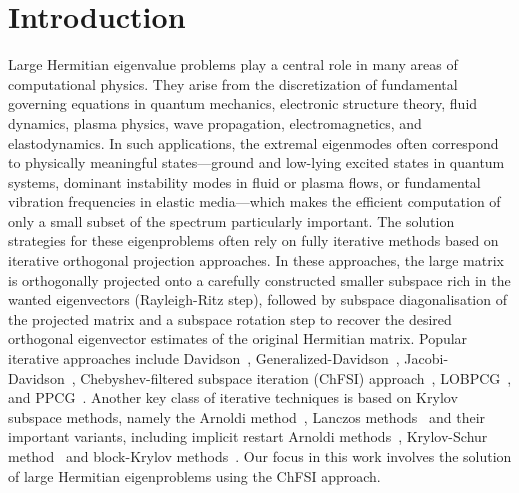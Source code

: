\documentclass[preprint,3p,number,sort&compress]{elsarticle}
\begin{document}
\section{Introduction}
Large Hermitian eigenvalue problems play a central role in many areas of computational physics. They arise from the discretization of fundamental governing equations in quantum mechanics, electronic structure theory, fluid dynamics, plasma physics, wave propagation, electromagnetics, and elastodynamics. In such applications, the extremal eigenmodes often correspond to physically meaningful states—ground and low-lying excited states in quantum systems, dominant instability modes in fluid or plasma flows, or fundamental vibration frequencies in elastic media—which makes the efficient computation of only a small subset of the spectrum particularly important. The solution strategies for these eigenproblems often rely on fully iterative methods based on iterative orthogonal projection approaches. In these approaches, the large matrix is orthogonally projected onto a carefully constructed smaller subspace rich in the wanted eigenvectors (Rayleigh-Ritz step), followed by subspace diagonalisation of the projected matrix and a subspace rotation step to recover the desired orthogonal eigenvector estimates of the original Hermitian matrix. Popular iterative approaches include Davidson~\cite{crouzeixDavidsonMethod1994,davidsonIterativeCalculationFew1975}, Generalized-Davidson~\cite{morganGeneralizationsDavidsonsMethod1986}, Jacobi-Davidson~\cite{hochstenbachJacobiDavidsonMethod2006}, Chebyshev-filtered subspace iteration (ChFSI) approach~\cite{zhouSelfconsistentfieldCalculationsUsing2006}, LOBPCG~\cite{knyazevOptimalPreconditionedEigensolver2001}, and PPCG~\cite{vecharynskiProjectedPreconditionedConjugate2015}. Another key class of iterative techniques is based on Krylov subspace methods, namely the Arnoldi method~\cite{arnoldiPrincipleMinimizedIterations1951}, Lanczos methods~\cite{lanczosIterationMethodSolution1950} and their important variants, including implicit restart Arnoldi methods~\cite{sorensenImplicitApplicationPolynomial1992}, Krylov-Schur method~\cite{stewartKrylovSchurAlgorithmLarge2002} and block-Krylov methods~\cite{saadNumericalMethodsLarge2011}. Our focus in this work involves the solution of large Hermitian eigenproblems using the ChFSI approach.
\end{document}
